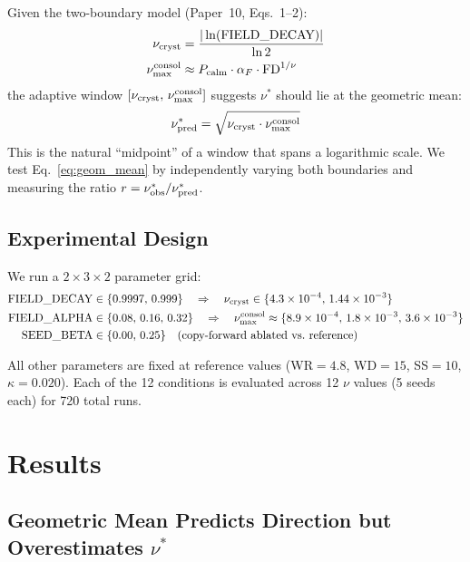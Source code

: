 \documentclass[11pt]{article}
\begin{document}
Given the two-boundary model (Paper~10, Eqs.~1--2):
\begin{align}
\nu_{\rm cryst} &= \frac{|\ln(\text{FIELD\_DECAY})|}{\ln 2}
   \label{eq:nu_cryst}\\
\nu_{\rm max}^{\rm consol} &\approx P_{\rm calm} \cdot \alpha_F \cdot
   \text{FD}^{1/\nu}  \label{eq:nu_max}
\end{align}
the adaptive window $[\nu_{\rm cryst},\, \nu_{\rm max}^{\rm consol}]$
suggests $\nu^*$ should lie at the geometric mean:
\begin{equation}
\nu^*_{\rm pred} = \sqrt{\nu_{\rm cryst} \cdot \nu_{\rm max}^{\rm consol}}
\label{eq:geom_mean}
\end{equation}
This is the natural ``midpoint'' of a window that spans a logarithmic scale.
We test Eq.~\eqref{eq:geom_mean} by independently varying both boundaries
and measuring the ratio $r = \nu^*_{\rm obs} / \nu^*_{\rm pred}$.

\subsection{Experimental Design}

We run a $2 \times 3 \times 2$ parameter grid:
\begin{align*}
\text{FIELD\_DECAY} &\in \{0.9997,\, 0.999\}
  \quad \Rightarrow \quad \nu_{\rm cryst} \in \{4.3\times10^{-4},\, 1.44\times10^{-3}\}\\
\text{FIELD\_ALPHA} &\in \{0.08,\, 0.16,\, 0.32\}
  \quad \Rightarrow \quad \nu_{\rm max}^{\rm consol} \approx \{8.9\times10^{-4},\, 1.8\times10^{-3},\, 3.6\times10^{-3}\}\\
\text{SEED\_BETA} &\in \{0.00,\, 0.25\}
  \quad \text{(copy-forward ablated vs.\ reference)}
\end{align*}

All other parameters are fixed at reference values (WR$=4.8$, WD$=15$,
SS$=10$, $\kappa=0.020$). Each of the 12 conditions is evaluated across 12
$\nu$ values (5 seeds each) for 720 total runs.

\section{Results}

\subsection{Geometric Mean Predicts Direction but Overestimates $\nu^*$}
\end{document}
